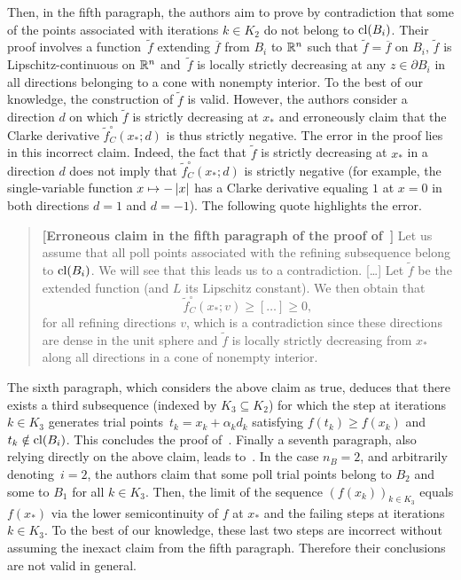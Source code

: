 Then, in the fifth paragraph, the authors aim to prove by contradiction that some of the \poll points associated with iterations $k \in K_2$ do not belong to $\mathrm{cl}(B_i)$.
Their proof involves a function~$\widetilde{f}$ extending $\overline{f}$ from $B_i$ to $\mathbb{R}^n$ such that $\widetilde{f} = \overline{f}$ on $B_i$, $\widetilde{f}$ is Lipschitz-continuous on $\mathbb{R}^n$ and~$\widetilde{f}$ is locally strictly decreasing at any $z \in \partial B_i$ in all directions belonging to a cone with nonempty interior.
To the best of our knowledge, the construction of $\widetilde{f}$ is valid.
However, the authors consider a direction $d$ on which $\widetilde{f}$ is strictly decreasing at $x_*$ and erroneously claim that the Clarke derivative $\widetilde{f}^\circ_C(x_*;d)$ is thus strictly negative.
The error in the proof lies in this incorrect claim.
Indeed, the fact that $\widetilde{f}$ is strictly decreasing at $x_*$ in a direction $d$ does not imply that $\widetilde{f}^\circ_C(x_*;d)$ is strictly negative (for example, the single-variable function $x \mapsto -\left\lvert{x}\right\rvert$ has a Clarke derivative equaling $1$ at $x = 0$ in both directions $d = 1$ and $d = -1$).
The following quote highlights the error.

\begin{quote}\textbf{[Erroneous claim in the fifth paragraph of the proof of~\cite[Theorem~4.1]{ViCu2012}]}
	Let us assume that all poll points associated with the refining subsequence belong to $\mathrm{cl}(B_i)$.
	We will see that this leads us to a contradiction.
	[\dots]
	Let $\widetilde{f}$ be the extended function (and $L$ its Lipschitz constant).
	We then obtain that
	\begin{equation*}
		\widetilde{f}^\circ_C(x_*;v) \geq [\dots] \geq 0,
	\end{equation*}
    for all refining directions $v$, which is a contradiction since these directions are dense in the unit sphere and $\widetilde{f}$ is locally strictly decreasing from $x_*$ along all directions in a cone of nonempty interior.
\end{quote}

The sixth paragraph, which considers the above claim as true, deduces that there exists a third subsequence (indexed by $K_3 \subseteq K_2$) for which the \poll step at iterations $k \in K_3$ generates trial points~$t_k = x_k+\alpha_kd_k$ satisfying $f(t_k) \geq f(x_k)$ and $t_k \notin \mathrm{cl}(B_i)$.
This concludes the proof of~\cite[Theorem~4.1]{ViCu2012}.
Finally a seventh paragraph, also relying directly on the above claim, leads to~\cite[Corollary~4.1]{ViCu2012}.
In the case $n_B = 2$, and arbitrarily denoting~$i = 2$, the authors claim that some poll trial points belong to $B_2$ and some to $B_1$ for all $k \in K_3$.
Then, the limit of the sequence $(f(x_k))_{k \in K_3}$ equals $f(x_*)$ via the lower semicontinuity of $f$ at $x_*$ and the failing \poll steps at iterations $k \in K_3$.
To the best of our knowledge, these last two steps are incorrect without assuming the inexact claim from the fifth paragraph. 
Therefore their conclusions are not valid in general.





